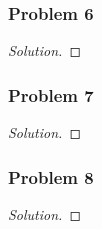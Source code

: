 \documentclass[11pt]{article}
\newcommand{\1}{\mathbf{1}}
\theoremstyle{definition}
\newenvironment{solution}{\begin{proof}[Solution]}{\end{proof}}
\begin{document}
\subsubsection*{Problem 6}
\begin{solution}
\end{solution}

\subsubsection*{Problem 7}
\begin{solution}
\end{solution}

\subsubsection*{Problem 8}
\begin{solution}
\end{solution}
\end{document}
